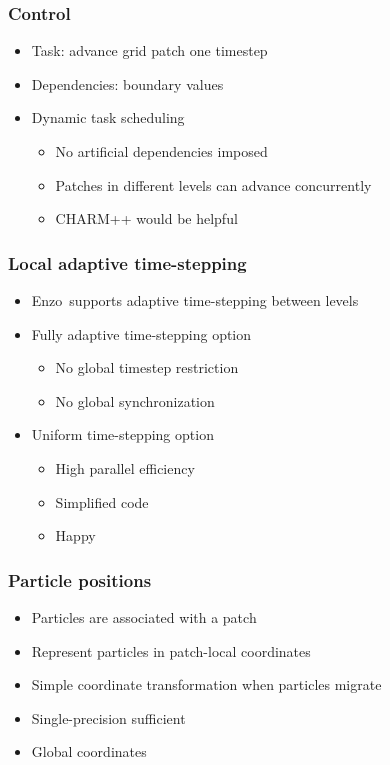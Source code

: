 \documentclass{beamer}
\newcommand{\enzo}{\textsf{Enzo}}
\begin{document}
    \begin{frame}[fragile] \frametitle{Control}
      \begin{itemize}
        \item Task: advance grid patch one timestep
        \item Dependencies: boundary values
        \item Dynamic task scheduling
        \begin{itemize}
          \item No artificial dependencies imposed
          \item Patches in different levels can advance concurrently
          \item CHARM++ would be helpful
        \end{itemize}
      \end{itemize}
\end{frame}

    \begin{frame}[fragile] \frametitle{Local adaptive time-stepping}
      \begin{itemize}
        \item \enzo\ supports adaptive time-stepping between levels
        \item Fully adaptive time-stepping option
        \begin{itemize}
          \item No global timestep restriction
          \item No global synchronization
        \end{itemize}
        \item Uniform time-stepping option
        \begin{itemize}
          \item High parallel efficiency
          \item Simplified code
          \item Happy
        \end{itemize}
      \end{itemize}
\end{frame}

    \begin{frame}[fragile] \frametitle{Particle positions}
      \begin{itemize}
        \item Particles are associated with a patch
        \item Represent particles in patch-local coordinates
        \item Simple coordinate transformation when particles migrate
        \item Single-precision sufficient
        \item Global coordinates
      \end{itemize}
\end{frame}
\end{document}
